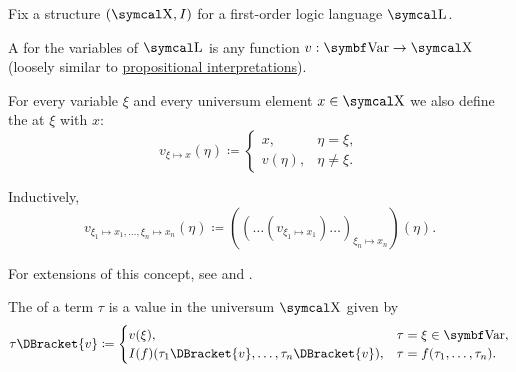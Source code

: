 \begin{definition}\label{def:first_order_valuation}
  Fix a structure \( (\CX, I) \) for a first-order logic language \( \CL \).

  \begin{DefEnum}
     A  for the variables of \( \CL \) is any function \( v: \Bold{Var} \to \CX \) (loosely similar to \hyperref[def:propositional_valuation/interpretation]{propositional interpretations}).

     For every variable \( \xi \) and every universum element \( x \in \CX \) we also define the  at \( \xi \) with \( x \):
    \begin{equation*}
      v_{\xi \mapsto x}(\eta) \coloneqq \begin{cases}
        x,       &\eta = \xi, \\
        v(\eta), &\eta \neq \xi.
      \end{cases}
    \end{equation*}

    Inductively\IND,
    \begin{equation*}
      v_{\xi_1 \mapsto x_1, \ldots, \xi_n \mapsto x_n}(\eta) \coloneqq ((\ldots(v_{\xi_1 \mapsto x_1})\ldots)_{\xi_n \mapsto x_n})(\eta).
    \end{equation*}

    For extensions of this concept, see  and .

     The  of a term \( \tau \) is a value in the universum \( \CX \) given by
    \begin{equation}\label{eq:def:first_order_valuation/term_valuation}
      \tau\DBracket{v} \coloneqq \begin{cases}
        v(\xi),                                     &\tau = \xi \in \Bold{Var}, \\
        I(f)(\tau_1\DBracket{v}, \ldots, \tau_n\DBracket{v}), &\tau = f(\tau_1, \ldots, \tau_n).
      \end{cases}
    \end{equation}


\end{DefEnum}
\end{definition}
